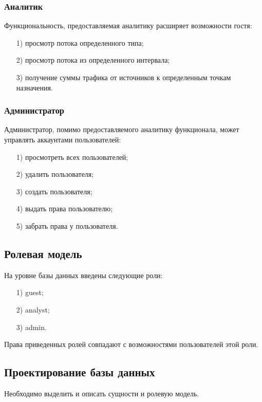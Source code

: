 \subsubsection{Аналитик}
Функциональность, предоставляемая аналитику расширяет возможности гостя:
\begin{itemize}
	\item[1)] просмотр потока определенного типа;
	\item[2)] просмотр потока из определенного интервала;
	\item[3)] получение суммы трафика от источников к определенным точкам назначения.
\end{itemize}
\subsubsection{Администратор}
Администратор, помимо предоставляемого аналитику функционала, может управлять аккаунтами пользователей:
\begin{itemize}
	\item[1)] просмотреть всех пользователей;
	\item[2)] удалить пользователя;
	\item[3)] создать пользователя;
	\item[4)] выдать права пользователю;
	\item[5)] забрать права у пользователя.
\end{itemize}

\subsection{Ролевая модель}
На уровне базы данных введены следующие роли:
\begin{itemize}
	\item[1)] guest;
	\item[2)] analyst;
	\item[3)] admin.
\end{itemize}
\indent \indent Права приведенных ролей совпадают с возможностями пользователей этой роли.


\subsection{Проектирование базы данных}
Необходимо выделить и описать сущности и ролевую модель.
